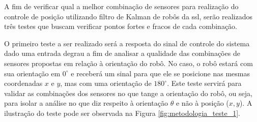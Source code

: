 \documentclass[acronym, symbols]{fei}
\begin{document}
		A fim de verificar qual a melhor combinação de sensores para realização do controle de posição utilizando filtro de Kalman de robôs da \acrshort{ssl}, serão realizados três testes que buscam verificar pontos fortes e fracos de cada combinação.
		
		O primeiro teste a ser realizado será a resposta do sinal de controle do sistema dado uma entrada degrau a fim de analisar a qualidade das combinações de sensores propostas em relação à orientação do robô. No caso, o robô estará com sua orientação em $0^\circ$ e receberá um sinal para que ele se posicione nas mesmas coordenadas $x$ e $y$, mas com uma orientação de $180^\circ$. Este teste servirá para validar as combinações dos sensores no que tange a orientação do robô, ou seja, para isolar a análise no que diz respeito à orientação $\theta$ e não à posição ($x, y$). A ilustração do teste pode ser observada na Figura \ref{fig:metodologia_teste_1}.
		
\end{document}
